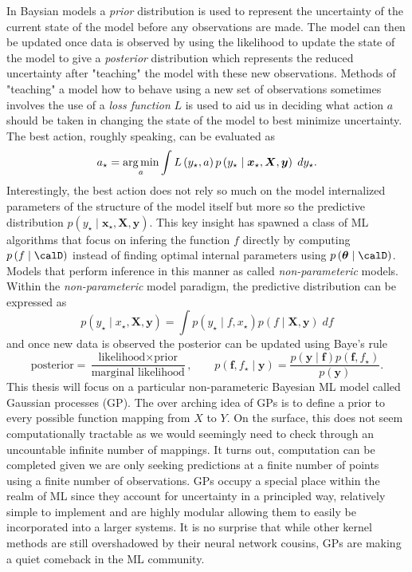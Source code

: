 In Baysian models a {\it prior} distribution is used to represent the uncertainty of the current state of the model before any observations are made. The model can then be updated once data is observed by using the likelihood to update the state of the model to give a {\it posterior} distribution which represents the reduced uncertainty after "teaching" the model with these new observations. Methods of "teaching" a model how to behave using a new set of observations sometimes involves the use of a {\it loss function} $L$ is used to aid us in deciding what action $a$ should be taken in changing the state of the model to best minimize uncertainty. The best action, roughly speaking, can be evaluated as
\begin{equation*}
    a_{\star} =  \operatorname*{\arg\min}_{a} \int L \left( y_{\star} , a \right) p \left( y_{\star} \mid \bm{x}_{\star}, \bm{X}, \bm{y} \right) \; d y_{\star}.
\end{equation*}
Interestingly, the best action does not rely so much on the model internalized parameters of the structure of the model itself but more so the predictive distribution $p \left( y_{\star} \mid \bm{x}_{\star}, \bm{X}, \bm{y} \right)$. This key insight has spawned a class of ML algorithms that focus on infering the function $f$ directly by computing $p \left( f \mid \calD \right)$ instead of finding optimal internal parameters using $p \left( \bm{\theta} \mid \calD \right)$. Models that perform inference in this manner as called {\it non-parameteric} models. Within the {\it non-parameteric} model paradigm, the predictive distribution can be expressed as
\begin{equation*}
    p \left( y_{\star} \mid x_{\star} , \bm{X} , \bm{y} \right) = \int p \left( y_{\star} \mid f , x_{\star} \right) p \left( f \mid \bm{X} , \bm{y} \right) \; df
\end{equation*}
and once new data is observed the posterior can be updated using Baye's rule
\begin{equation*}
    \text{posterior} = \frac{\text{likelihood} \times \text{prior}}{\text{marginal likelihood}}, \qquad p \left( \bm{f} , f_{\star} \mid \bm{y} \right) = \frac{p \left( \bm{y} \mid \bm{f} \right) p \left( \bm{f} , f_{\star} \right) }{p \left( \bm{y} \right)}.
\end{equation*}
This thesis will focus on a particular non-parameteric Bayesian ML model called Gaussian processes (GP). The over arching idea of GPs is to define a prior to every possible function mapping from $X$ to $Y$. On the surface, this does not seem computationally tractable as we would seemingly need to check through an uncountable infinite number of mappings. It turns out, computation can be completed given we are only seeking predictions at a finite number of points using a finite number of observations. GPs occupy a special place within the realm of ML since they account for uncertainty in a principled way, relatively simple to implement and are highly modular allowing them to easily be incorporated into a larger systems. It is no surprise that while other kernel methods are still overshadowed by their neural network cousins, GPs are making a quiet comeback in the ML community.


\newpage
{}

